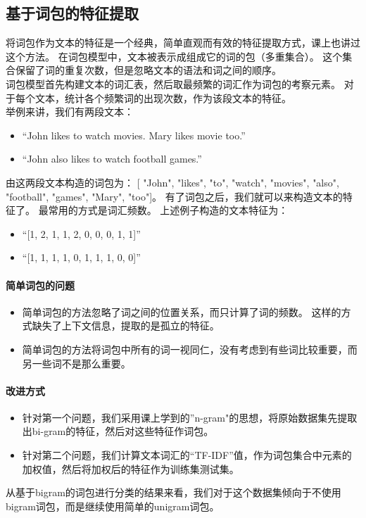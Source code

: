 \subsection{基于词包的特征提取}
将词包作为文本的特征是一个经典，简单直观而有效的特征提取方式，课上也讲过这个方法。
在词包模型中，文本被表示成组成它的词的包（多重集合）。
这个集合保留了词的重复次数，但是忽略文本的语法和词之间的顺序。\\
词包模型首先构建文本的词汇表，然后取最频繁的词汇作为词包的考察元素。
对于每个文本，统计各个频繁词的出现次数，作为该段文本的特征。\\
举例来讲，我们有两段文本：
\begin{itemize}
	\item
	``John likes to watch movies. Mary likes movie too.''
	\item
	``John also likes to watch football games.''
\end{itemize}
由这两段文本构造的词包为：
[ "John", "likes", "to", "watch", "movies", "also", "football", "games", "Mary", "too"]。
有了词包之后，我们就可以来构造文本的特征了。
最常用的方式是词汇频数。
上述例子构造的文本特征为：
\begin{itemize}
	\item
	``[1, 2, 1, 1, 2, 0, 0, 0, 1, 1]''
	\item
	``[1, 1, 1, 1, 0, 1, 1, 1, 0, 0]''
\end{itemize}



\paragraph{简单词包的问题}
\begin{itemize}
	\item
	简单词包的方法忽略了词之间的位置关系，而只计算了词的频数。
	这样的方式缺失了上下文信息，提取的是孤立的特征。
	\item
	简单词包的方法将词包中所有的词一视同仁，没有考虑到有些词比较重要，而另一些词不是那么重要。
\end{itemize}
\paragraph{改进方式}
\begin{itemize}
	\item
	针对第一个问题，我们采用课上学到的”n-gram"的思想，将原始数据集先提取出bi-gram的特征，然后对这些特征作词包。
	\item
	针对第二个问题，我们计算文本词汇的“TF-IDF”值，作为词包集合中元素的加权值，然后将加权后的特征作为训练集测试集。
\end{itemize}



从基于bigram的词包进行分类的结果来看，我们对于这个数据集倾向于不使用bigram词包，而是继续使用简单的unigram词包。



